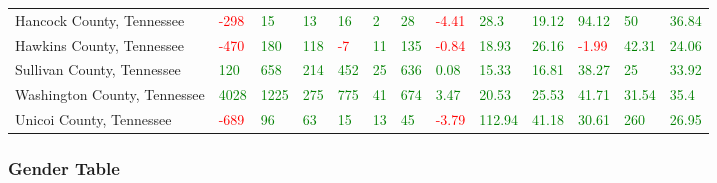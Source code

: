 \documentclass[
]{article}
\begin{document}
\begin{table}[H]
{\begin{tabular}{lllllllllllll}
\addlinespace
Hancock County, Tennessee & \textcolor{red}{-298} & \textcolor{green}{15} & \textcolor{green}{13} & \textcolor{green}{16} & \textcolor{green}{2} & \textcolor{green}{28} & \textcolor{red}{-4.41} & \textcolor{green}{28.3} & \textcolor{green}{19.12} & \textcolor{green}{94.12} & \textcolor{green}{50} & \textcolor{green}{36.84}\\
\rowcolor{gray!6}  Hawkins County, Tennessee & \textcolor{red}{-470} & \textcolor{green}{180} & \textcolor{green}{118} & \textcolor{red}{-7} & \textcolor{green}{11} & \textcolor{green}{135} & \textcolor{red}{-0.84} & \textcolor{green}{18.93} & \textcolor{green}{26.16} & \textcolor{red}{-1.99} & \textcolor{green}{42.31} & \textcolor{green}{24.06}\\
Sullivan County, Tennessee & \textcolor{green}{120} & \textcolor{green}{658} & \textcolor{green}{214} & \textcolor{green}{452} & \textcolor{green}{25} & \textcolor{green}{636} & \textcolor{green}{0.08} & \textcolor{green}{15.33} & \textcolor{green}{16.81} & \textcolor{green}{38.27} & \textcolor{green}{25} & \textcolor{green}{33.92}\\
\rowcolor{gray!6}  Washington County, Tennessee & \textcolor{green}{4028} & \textcolor{green}{1225} & \textcolor{green}{275} & \textcolor{green}{775} & \textcolor{green}{41} & \textcolor{green}{674} & \textcolor{green}{3.47} & \textcolor{green}{20.53} & \textcolor{green}{25.53} & \textcolor{green}{41.71} & \textcolor{green}{31.54} & \textcolor{green}{35.4}\\
Unicoi County, Tennessee & \textcolor{red}{-689} & \textcolor{green}{96} & \textcolor{green}{63} & \textcolor{green}{15} & \textcolor{green}{13} & \textcolor{green}{45} & \textcolor{red}{-3.79} & \textcolor{green}{112.94} & \textcolor{green}{41.18} & \textcolor{green}{30.61} & \textcolor{green}{260} & \textcolor{green}{26.95}\\
\bottomrule
\end{tabular}}
\end{table}

\hypertarget{gender-table}{%
\subsubsection{Gender Table}\label{gender-table}}
\end{document}
